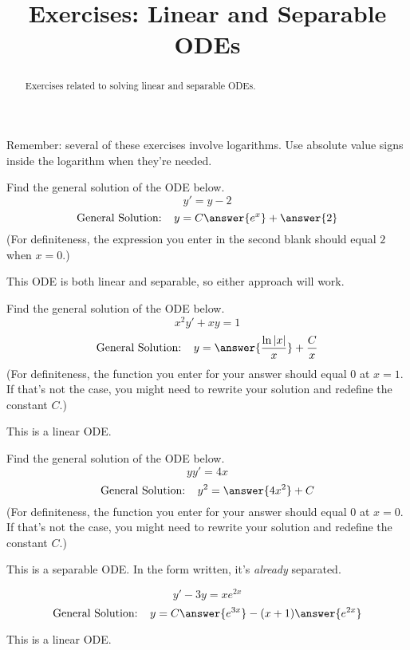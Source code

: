\documentclass{ximera}
\title{Exercises: Linear and Separable ODEs}
\begin{document}
\begin{abstract}
Exercises related to solving linear and separable ODEs.
\end{abstract}
\maketitle


Remember: several of these exercises involve logarithms. Use absolute value signs inside the logarithm when they're needed.

\begin{exercise}%
Find the general solution of the ODE below. 
\[ y' = y - 2 \]
\[ \text{General Solution: } \ \ y = C \answer{e^x} + \answer{2} \]
(For definiteness, the expression you enter in the second blank should equal $2$ when $x = 0$.)
\begin{hint}
This ODE is both linear and separable, so either approach will work.
\end{hint}
\end{exercise}

\begin{exercise}%
Find the general solution of the ODE below.
\[ x^2 y' + xy = 1 \]
\[ \text{General Solution: } \ \  y = \answer{\frac{\ln |x|}{x}} + \frac{C}{x} \]
(For definiteness, the function you enter for your answer should equal $0$ at $x=1$. If that's not the case, you might need to rewrite your solution and redefine the constant $C$.)
\begin{hint}
This is a linear ODE.
\end{hint}
\end{exercise}

\begin{exercise}%
Find the general solution of the ODE below.
\[ y y' = 4x \]
\[ \text{General Solution: } \ \  y^2 =  \answer{4 x^2} + C \]
(For definiteness, the function you enter for your answer should equal $0$ at $x=0$. If that's not the case, you might need to rewrite your solution and redefine the constant $C$.)
\begin{hint}
This is a separable ODE. In the form written, it's \textit{already} separated.
\end{hint}
\end{exercise}

\begin{exercise}%
\[ y'-3y=xe^{2x} \]
\[ \text{General Solution: } \ \  y = C\answer{e^{3x}}-(x+1)\answer{e^{2x}} \]
\begin{hint}
This is a linear ODE.
\end{hint}
\end{exercise}
\end{document}
